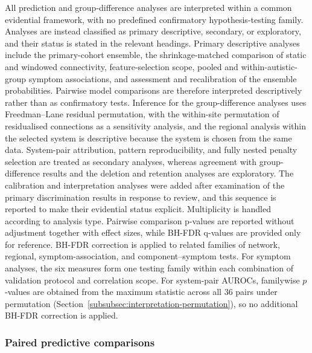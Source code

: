 All prediction and group-difference analyses are interpreted within a common evidential framework, with no predefined confirmatory hypothesis-testing family. Analyses are instead classified as primary descriptive, secondary, or exploratory, and their status is stated in the relevant headings. Primary descriptive analyses include the primary-cohort ensemble, the shrinkage-matched comparison of static and windowed connectivity, feature-selection scope, pooled and within-autistic-group symptom associations, and assessment and recalibration of the ensemble probabilities. Pairwise model comparisons are therefore interpreted descriptively rather than as confirmatory tests. Inference for the group-difference analyses uses Freedman--Lane residual permutation, with the within-site permutation of residualised connections as a sensitivity analysis, and the regional analysis within the selected system is descriptive because the system is chosen from the same data.  System-pair attribution, pattern reproducibility, and fully nested penalty selection are treated as secondary analyses, whereas agreement with group-difference results and the deletion and retention analyses are exploratory. The calibration and interpretation analyses were added after examination of the primary discrimination results in response to review, and this sequence is reported to make their evidential status explicit. Multiplicity is handled according to analysis type. Pairwise comparison p-values are reported without adjustment together with effect sizes, while BH-FDR q-values are provided only for reference. BH-FDR correction is applied to related families of network, regional, symptom-association, and component--symptom tests. For symptom analyses, the six measures form one testing family within each combination of validation protocol and correlation scope. For system-pair AUROCs, familywise $p$-values are obtained from the maximum statistic across all 36 pairs under permutation (Section~\ref{subsubsec:interpretation-permutation}), so no additional BH-FDR correction is applied.

\subsubsection{Paired predictive comparisons}
\label{subsubsec:paired-comparisons}

